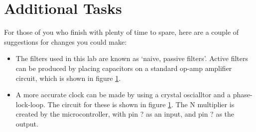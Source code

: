 \section{Additional Tasks}
For those of you who finish with plenty of time to spare, here are a couple of suggestions for changes you could make:

\begin{itemize}
\item The filters used in this lab are known as `naive, passive filters'. Active filters can be produced by placing capacitors on a standard op-amp amplifier circuit, which is shown in figure \ref{}.
\item A more accurate clock can be made by using a crystal oscialltor and a phase-lock-loop. The circuit for these is shown in figure \ref{}. The N multiplier is created by the microcontroller, with pin ? as an input, and pin ? as the output.
\end{itemize}

